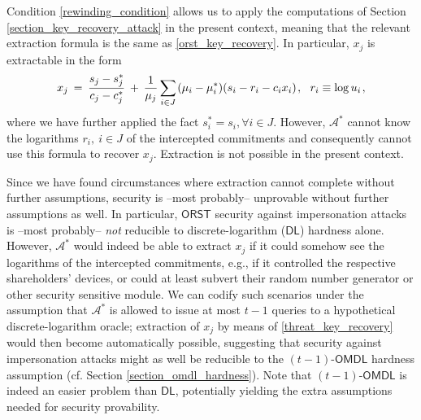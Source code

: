 \documentclass[psamsfonts, reqno]{amsart}
\theoremstyle{definition}
\theoremstyle{remark}
\numberwithin{equation}{section}
\begin{document}
Condition \eqref{rewinding_condition} allows us to apply the
computations of Section \ref{section_key_recovery_attack}
in the present context, meaning that the relevant extraction
formula is the same as \eqref{orst_key_recovery}.
In particular, $x_j$ is extractable in the form
\vspace{5pt}
\begin{equation}\label{threat_key_recovery}
x_j
\hspace{2pt}
=
\hspace{2pt}
\frac{s_j - s_j^*}{c_j - c_j^*}
\hspace{2pt}
+
\hspace{2pt}
\frac{1}{\mu_j} \sum_{i \in J}
\hspace{1pt}
	(\mu_i - \mu_i^*) (s_i - r_i - c_i x_i)\hspace{1pt},
\ \ r_i \equiv \log u_i\hspace{1pt},
\vspace{5pt}
\end{equation}
where we have further applied the fact $s_i^*=s_i,\forall i \in J$.
However, $\mathcal{A}^*$
cannot know the logarithms $r_i,\ i \in J$
of the intercepted commitments
and consequently cannot use
this formula to recover $x_j$.
Extraction is not possible in the present context.

Since we have found circumstances where
extraction cannot complete without further assumptions,
security is --most probably--
unprovable without further assumptions as well.
In particular,
$\mathsf{ORST}$ security
against impersonation attacks is --most probably--
\textit{not} reducible to
discrete-logarithm ($\mathsf{DL}$) hardness alone.
However, $\mathcal{A}^*$ would indeed be able to extract $x_j$
if it could somehow see the logarithms
of the intercepted commitments, e.g.,
if it controlled the respective shareholders' devices,
or could at least subvert their random number generator
or other security sensitive module.
We can codify such scenarios under the assumption
that $\mathcal{A}^*$ is allowed to issue at most
$t-1$ queries to a hypothetical discrete-logarithm oracle;
extraction of $x_j$ by means of \eqref{threat_key_recovery}
would then become automatically possible,
suggesting that security against impersonation attacks
might as well be reducible to the
$(t-1)$-$\mathsf{OMDL}$ hardness assumption
(cf. Section \ref{section_omdl_hardness}).
Note that $(t-1)$-$\mathsf{OMDL}$ is indeed
an easier problem than $\mathsf{DL}$,
potentially yielding the extra assumptions needed
for security provability.
\end{document}
